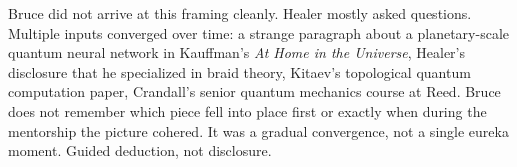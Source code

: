 Bruce did not arrive at this framing cleanly. Healer mostly asked questions. Multiple inputs converged over time: a strange paragraph about a planetary-scale quantum neural network in Kauffman's \textit{At Home in the Universe}, Healer's disclosure that he specialized in braid theory, Kitaev's topological quantum computation paper, Crandall's senior quantum mechanics course at Reed. Bruce does not remember which piece fell into place first or exactly when during the mentorship the picture cohered. It was a gradual convergence, not a single eureka moment. Guided deduction, not disclosure.

\chapterreturn
